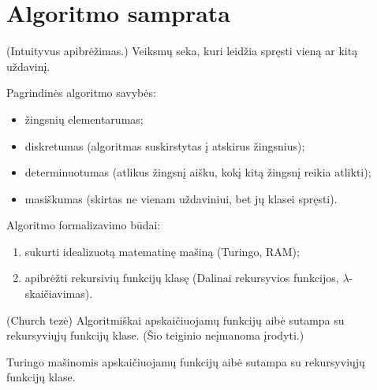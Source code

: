 \chapter{Algoritmo samprata}

\begin{defn}[Algoritmas]
  (Intuityvus apibrėžimas.) Veiksmų seka, kuri leidžia spręsti
  vieną ar kitą uždavinį.
\end{defn}

Pagrindinės algoritmo savybės:
\begin{itemize}
  \item žingsnių elementarumas;
  \item diskretumas (algoritmas suskirstytas į atskirus žingsnius);
  \item determinuotumas (atlikus žingsnį aišku, kokį kitą žingsnį 
    reikia atlikti);
  \item masiškumas (skirtas ne vienam uždaviniui, bet jų klasei 
    spręsti).
\end{itemize}

Algoritmo formalizavimo būdai:
\begin{enumerate}
  \item sukurti idealizuotą matematinę mašiną (Turingo, RAM);
  \item apibrėžti rekursivių funkcijų klasę (Dalinai rekursyvios funkcijos,
    $\lambda$-skaičiavimas).
\end{enumerate}

\begin{prop}
  (Church tezė) Algoritmiškai apskaičiuojamų funkcijų aibė sutampa su 
  rekursyviųjų funkcijų klase. (Šio teiginio neįmanoma įrodyti.)
\end{prop}

\begin{prop}
  Turingo mašinomis apskaičiuojamų funkcijų aibė sutampa su rekursyviųjų
  funkcijų klase.
\end{prop}
